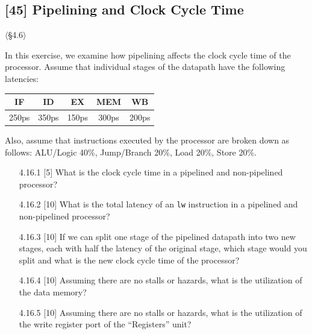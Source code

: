 \problembreak

\subsection{[45] Pipelining and Clock Cycle Time}
\hypertarget{prob-4.16}{}
\noindent$\langle$\S4.6$\rangle$\medskip

\noindent In this exercise, we examine how pipelining affects the clock cycle
time of the processor. Assume that individual stages of the datapath have
the following latencies:

\begin{center}
\begin{tabular}{ccccc}
\toprule
\textbf{IF} & \textbf{ID} & \textbf{EX} & \textbf{MEM} & \textbf{WB} \\
\midrule
250ps & 350ps & 150ps & 300ps & 200ps \\
\bottomrule
\end{tabular}
\end{center}

\noindent Also, assume that instructions executed by the processor are broken
down as follows: ALU/Logic 40\%, Jump/Branch 20\%, Load 20\%, Store 20\%.

\begin{enumerate}
  \item[4.16.1] [5] What is the clock cycle time in a pipelined and
        non-pipelined processor?
  \item[4.16.2] [10] What is the total latency of an \texttt{lw} instruction
        in a pipelined and non-pipelined processor?
  \item[4.16.3] [10] If we can split one stage of the pipelined datapath
        into two new stages, each with half the latency of the original
        stage, which stage would you split and what is the new clock cycle
        time of the processor?
  \item[4.16.4] [10] Assuming there are no stalls or hazards, what is the
        utilization of the data memory?
  \item[4.16.5] [10] Assuming there are no stalls or hazards, what is the
        utilization of the write register port of the ``Registers'' unit?
\end{enumerate}

